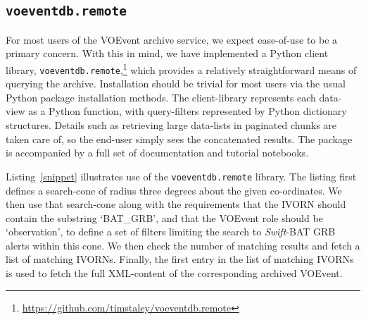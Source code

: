 \documentclass[5p,authoryear]{elsarticle}
\begin{document}
\subsection{\texttt{voeventdb.remote}}





For most users of the VOEvent archive service, we expect ease-of-use to be a primary concern. 
With this in mind, we have implemented a Python client library, \texttt{voeventdb.remote},\footnote{\url{https://github.com/timstaley/voeventdb.remote}}
which provides a relatively straightforward means of querying the archive. 
Installation should be trivial for most users via the usual Python package installation methods.
The client-library represents each data-view as a Python function, with query-filters represented by Python dictionary structures.
Details such as retrieving large data-lists in paginated chunks are taken care of, so the end-user simply sees the concatenated results. The package is accompanied by a full set of documentation and tutorial notebooks.

Listing~\ref{snippet} illustrates use of the \texttt{voeventdb.remote} library.
The listing first defines a search-cone of radius three degrees about the given co-ordinates. 
We then use that search-cone along with the requirements that the IVORN should contain the substring `BAT\_GRB', and that the VOEvent role should be `observation', to define a set of filters limiting the search to \textit{Swift}-BAT GRB alerts within this cone. 
We then check the number of matching results and fetch a list of matching IVORNs.
Finally, the first entry in the list of matching IVORNs is used to fetch the full XML-content of the corresponding archived VOEvent.
\end{document}
